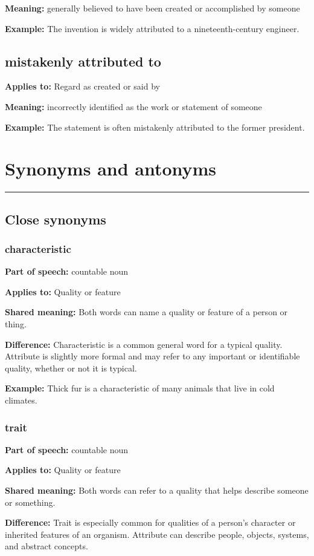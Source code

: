 \documentclass[11pt]{article}
\newcommand{\sectionrule}{\par\vspace{-0.5em}\noindent\textcolor{Accent}{\rule{\linewidth}{0.6pt}}\par}
\begin{document}
\textbf{Meaning:} generally believed to have been created or accomplished by someone

\textbf{Example:} The invention is widely attributed to a nineteenth-century engineer.

\subsection{mistakenly attributed to}
\textbf{Applies to:} Regard as created or said by

\textbf{Meaning:} incorrectly identified as the work or statement of someone

\textbf{Example:} The statement is often mistakenly attributed to the former president.

\section{Synonyms and antonyms}
\sectionrule
\subsection{Close synonyms}
\subsubsection{characteristic}
\textbf{Part of speech:} countable noun

\textbf{Applies to:} Quality or feature

\textbf{Shared meaning:} Both words can name a quality or feature of a person or thing.

\textbf{Difference:} Characteristic is a common general word for a typical quality. Attribute is slightly more formal and may refer to any important or identifiable quality, whether or not it is typical.

\textbf{Example:} Thick fur is a characteristic of many animals that live in cold climates.

\subsubsection{trait}
\textbf{Part of speech:} countable noun

\textbf{Applies to:} Quality or feature

\textbf{Shared meaning:} Both words can refer to a quality that helps describe someone or something.

\textbf{Difference:} Trait is especially common for qualities of a person's character or inherited features of an organism. Attribute can describe people, objects, systems, and abstract concepts.
\end{document}
